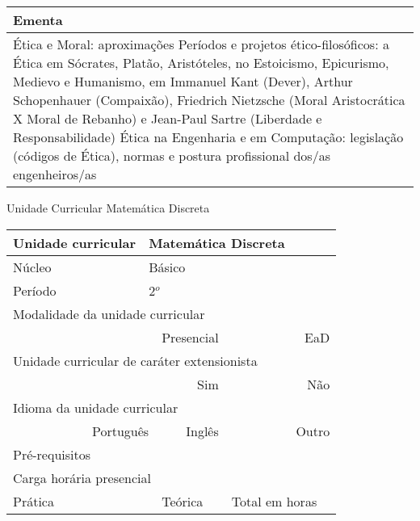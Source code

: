 \begin{quadro}[ht!]
\begin{tabular}{|p{3cm} p{2cm} p{3cm} p{2cm} p{3cm} p{2cm}|}
\multicolumn{6}{|p{15cm}|}{\cellcolor{blue1} Ementa} \\\hline
\hline\multicolumn{6}{|p{15cm}|}{\scriptsize Ética e Moral: aproximações Períodos e projetos ético-filosóficos: a Ética em Sócrates, Platão, Aristóteles, no Estoicismo, Epicurismo, Medievo e Humanismo, em Immanuel Kant (Dever), Arthur Schopenhauer (Compaixão), Friedrich Nietzsche (Moral Aristocrática X Moral de Rebanho) e Jean-Paul Sartre (Liberdade e Responsabilidade) Ética na Engenharia e em Computação: legislação (códigos de Ética), normas e postura profissional dos/as engenheiros/as}\\\hline 
\hline
	\end{tabular}
\end{quadro}


\begin{quadro}[ht!]
  \centering\scriptsize
\caption{Unidade Curricular Matemática Discreta}
\begin{tabular}{|p{3cm} p{2cm} p{3cm} p{2cm} p{3cm} p{2cm}|}\hline
\multicolumn{1}{|p{3cm}|}{\cellcolor{blue1} Unidade curricular} & \multicolumn{5}{p{9cm}|}{Matemática Discreta}\\\hline
\multicolumn{1}{|p{3cm}|}{\cellcolor{blue1} Núcleo} & \multicolumn{5}{p{11.5cm}|}{Básico}\\\hline
\multicolumn{1}{|p{3cm}|}{\cellcolor{blue1} Período} & \multicolumn{5}{p{9cm}|}{2$^o$}\\\hline
\multicolumn{6}{|p{15cm}|}{\cellcolor{blue1} Modalidade da unidade curricular} \\\hline
\multicolumn{2}{|r}{		} &  \multicolumn{2}{r}{Presencial \XBox} & \multicolumn{2}{r|}{EaD \Square	} \\\hline
\multicolumn{6}{|p{15cm}|}{\cellcolor{blue1} Unidade curricular de caráter extensionista} \\\hline
\multicolumn{4}{|r}{			Sim \XBox	} & \multicolumn{2}{r|}{	Não \Square	}\\\hline
\multicolumn{6}{|p{15cm}|}{\cellcolor{blue1} Idioma da unidade curricular} \\ \hline
\multicolumn{2}{|r}{	Português \XBox	} &  \multicolumn{2}{r}{	Inglês \Square	} & \multicolumn{2}{r|}{	Outro \Square	} \\ \hline
\multicolumn{1}{|p{3cm}|}{\cellcolor{blue1} Pré-requisitos} & \multicolumn{5}{p{9cm}|}{}\\ \hline
\multicolumn{6}{|p{15cm}|}{\cellcolor{blue1} Carga horária presencial} \\ \hline
\multicolumn{1}{|p{3cm}|}{\raggedleft Prática} & \multicolumn{1}{p{1cm}|}{\centering	30	} &  \multicolumn{1}{p{3cm}|}{\raggedleft Teórica}  & \multicolumn{1}{p{1cm}|}{\centering 	30	} & \multicolumn{1}{p{3cm}|}{\raggedleft Total em horas} & \multicolumn{1}{p{1cm}|}{\raggedleft	60	} \\ \hline 

\end{tabular}
\end{quadro}
